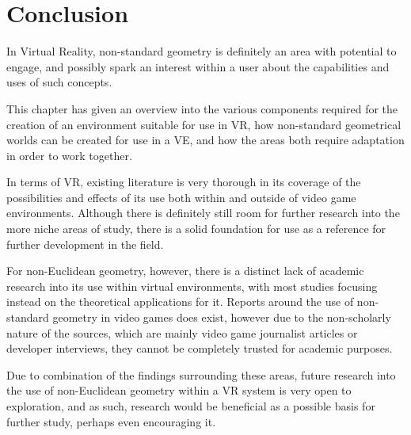 \section{Conclusion}
\label{lr:conclusion}

\begin{multicols*}{2}
	In Virtual Reality, non-standard geometry is definitely an area with potential to engage, and possibly spark an interest within a user about the capabilities and uses of such concepts.

	This chapter has given an overview into the various components required for the creation of an environment suitable for use in VR, how non-standard geometrical worlds can be created for use in a VE, and how the areas both require adaptation in order to work together.

	In terms of VR, existing literature is very thorough in its coverage of the possibilities and effects of its use both within and outside of video game environments.
	Although there is definitely still room for further research into the more niche areas of study, there is a solid foundation for use as a reference for further development in the field.

	For non-Euclidean geometry, however, there is a distinct lack of academic research into its use within virtual environments, with most studies focusing instead on the theoretical applications for it.
	Reports around the use of non-standard geometry in video games does exist, however due to the non-scholarly nature of the sources, which are mainly video game journalist articles or developer interviews, they cannot be completely trusted for academic purposes.

	Due to combination of the findings surrounding these areas, future research into the use of non-Euclidean geometry within a VR system is very open to exploration, and as such, research would be beneficial as a possible basis for further study, perhaps even encouraging it.
\end{multicols*}
